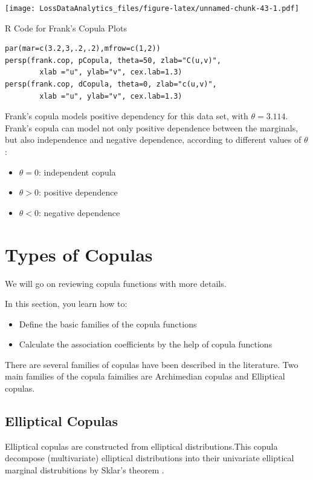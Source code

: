 \documentclass[]{book}
\providecommand{\tightlist}{%
  \setlength{\itemsep}{0pt}\setlength{\parskip}{0pt}}
\theoremstyle{definition}
\theoremstyle{definition}
\theoremstyle{definition}
\theoremstyle{remark}
\begin{document}
\texttt{[image: LossDataAnalytics\_files/figure-latex/unnamed-chunk-43-1.pdf]}

R Code for Frank's Copula Plots

\hypertarget{display.DistriPlot.2}{}
\begin{verbatim}
par(mar=c(3.2,3,.2,.2),mfrow=c(1,2))
persp(frank.cop, pCopula, theta=50, zlab="C(u,v)",
        xlab ="u", ylab="v", cex.lab=1.3)
persp(frank.cop, dCopula, theta=0, zlab="c(u,v)",
        xlab ="u", ylab="v", cex.lab=1.3)
\end{verbatim}

Frank's copula models positive dependency for this data set, with
\(\theta=3.114\). Frank's copula can model not only positive dependence
between the marginals, but also independence and negative dependence,
according to different values of \(\theta\):

\begin{itemize}
\tightlist
\item
  \(\theta=0\): independent copula
\item
  \(\theta>0\): positive dependence
\item
  \(\theta<0\): negative dependence
\end{itemize}

\section{Types of Copulas}\label{S:CopTyp}

We will go on reviewing copula functions with more details.

In this section, you learn how to:

\begin{itemize}
\tightlist
\item
  Define the basic families of the copula functions
\item
  Calculate the association coefficients by the help of copula functions
\end{itemize}

There are several families of copulas have been described in the
literature. Two main families of the copula faimilies are Archimedian
copulas and Elliptical copulas.

\subsection{Elliptical Copulas}\label{elliptical-copulas}

Elliptical copulas are constructed from elliptical distributions.This
copula decompose (multivariate) elliptical distributions into their
univariate elliptical marginal distrubitions by Sklar's theorem
\citep{yan2017elements}.
\end{document}
